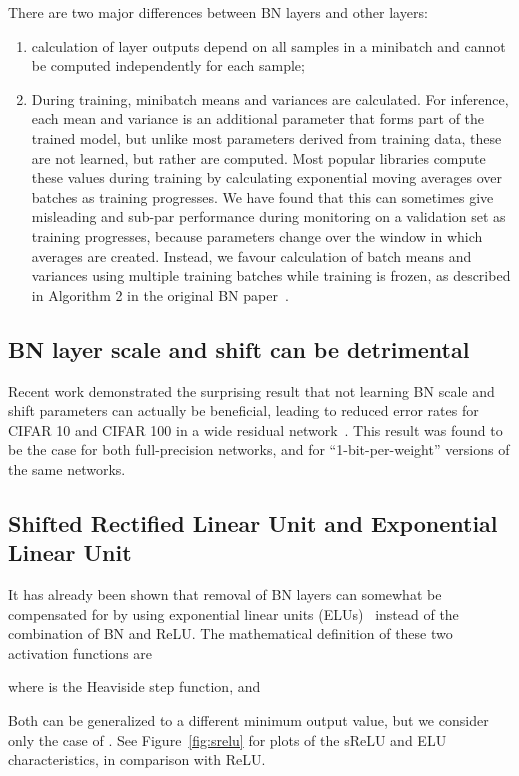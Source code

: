 \documentclass[conference]{IEEEtran}
\begin{document}
 There are two major differences between BN layers and other layers:
 \begin{enumerate}
     \item calculation of layer outputs depend on all samples in a minibatch and cannot be computed independently for each sample;
     \item During training, minibatch  means and variances are calculated. For inference, each mean and variance is an additional parameter that forms part of the trained model, but unlike most parameters derived from training data, these are not learned, but rather are computed.  Most popular libraries compute these values during training by calculating exponential moving averages over batches as training progresses. We have found that this can sometimes give misleading and sub-par performance during monitoring on a validation set as training progresses, because parameters change over the window in which averages are created. Instead, we favour calculation of batch means and variances using multiple training batches while training is frozen, as described in Algorithm 2 in the original BN paper~\cite{Ioffe.15}.
 \end{enumerate}
 
\subsection{BN layer scale and shift can be detrimental} 
 
Recent work demonstrated the surprising result that not learning BN scale and shift parameters can actually be beneficial, leading to reduced error rates for CIFAR 10 and CIFAR 100 in a wide residual network~\cite{McDonnell.18}. This result was found to be the case for both full-precision networks, and for ``1-bit-per-weight'' versions of the same networks.

\subsection{Shifted Rectified Linear Unit and Exponential Linear Unit}

It has already been shown that removal of BN layers can somewhat be compensated for by using exponential linear units (ELUs)~\cite{Clevert.15} instead of the combination of BN and ReLU. The mathematical definition of these two activation functions are

where  is the Heaviside step function,
and

Both can be generalized to a different minimum output value, but we consider only the case of . See Figure~\ref{fig:srelu} for plots of the sReLU and ELU characteristics, in comparison with ReLU.
\end{document}
